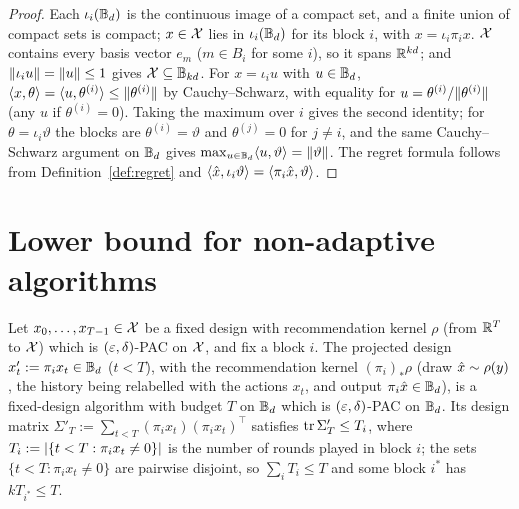 \begin{proof}
\leanok
{}
Each $\iota_i(\mathbb{B}_d)$ is the continuous image of a compact set, and a finite union
of compact sets is compact; $x \in \mathcal{X}$ lies in $\iota_i(\mathbb{B}_d)$ for its block $i$, with
$x = \iota_i\pi_i x$. $\mathcal{X}$ contains every basis vector $e_m$ ($m \in B_i$ for some
$i$), so it spans $\mathbb{R}^{kd}$; and $\lVert \iota_i u \rVert = \lVert u \rVert \le 1$ gives $\mathcal{X} \subseteq \mathbb{B}_{kd}$.
For $x = \iota_i u$ with $u \in \mathbb{B}_d$, $\langle x, \theta \rangle = \langle u, \theta^{(i)} \rangle \le \lVert \theta^{(i)} \rVert$
by Cauchy--Schwarz, with equality for $u = \theta^{(i)}/\lVert \theta^{(i)} \rVert$ (any $u$ if
$\theta^{(i)} = 0$). Taking the maximum over $i$ gives the second identity; for
$\theta = \iota_i\vartheta$ the blocks are $\theta^{(i)} = \vartheta$ and $\theta^{(j)} = 0$
for $j \ne i$, and the same Cauchy--Schwarz argument on $\mathbb{B}_d$ gives
$\max_{u\in\mathbb{B}_d}\langle u, \vartheta \rangle = \lVert \vartheta \rVert$. The regret formula follows from
Definition~\ref{def:regret} and $\langle \hat{x}, \iota_i\vartheta \rangle = \langle \pi_i\hat{x}, \vartheta \rangle$.
\end{proof}

\section{Lower bound for non-adaptive algorithms}
\label{sec:separation_lower}

\begin{lemma}\label{lem:block_restriction}
\leanok
{}
Let $x_0,\dots,x_{T-1} \in \mathcal{X}$ be a fixed design with recommendation kernel $\rho$ (from
$\mathbb{R}^T$ to $\mathcal{X}$) which is $(\varepsilon,\delta)$-PAC on $\mathcal{X}$, and fix a block $i$. The projected
design $x'_t := \pi_i x_t \in \mathbb{B}_d$ ($t < T$), with the recommendation kernel
$(\pi_i)_*\rho$ (draw $\hat{x} \sim \rho(y)$, the history being relabelled with the actions $x_t$,
and output $\pi_i\hat{x} \in \mathbb{B}_d$), is a fixed-design algorithm with budget $T$ on $\mathbb{B}_d$
which is $(\varepsilon,\delta)$-PAC on $\mathbb{B}_d$. Its design matrix
$\Sigma'_T := \sum_{t<T}(\pi_ix_t)(\pi_ix_t)^\top$ satisfies $\operatorname{tr}\Sigma'_T \le T_i$, where
$T_i := \lvert \{t < T : \pi_i x_t \ne 0\} \rvert$ is the number of rounds played in block $i$; the sets
$\{t < T : \pi_ix_t \ne 0\}$ are pairwise disjoint, so $\sum_i T_i \le T$ and some block $i^*$
has $kT_{i^*} \le T$.
\end{lemma}

